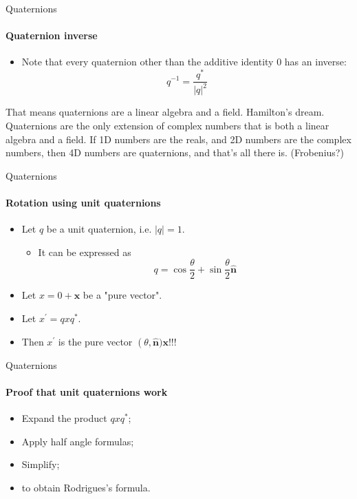 \documentclass[aspectratio=169]{beamer}
\begin{document}
\begin{frame}{Quaternions}
	\framesubtitle{Quaternion inverse}
    \begin{itemize}
        \item[]Note that every quaternion other than the additive identity $0$ has an inverse:
        \[ q^{-1} = \frac{q^*}{|q|^2} \]
    \end{itemize}
        That means quaternions are a linear algebra and a field.  Hamilton's dream.  Quaternions are the only extension of  complex numbers that is both a linear algebra and a field.  If 1D numbers are the reals, and 2D numbers are the complex numbers, then 4D numbers are quaternions, and that's all there is.  (Frobenius?)
    \end{frame}

\begin{frame}{Quaternions}
    \framesubtitle{Rotation using unit quaternions}

    \begin{itemize}
        \item Let $q$ be a unit quaternion, i.e. $|q|=1$.
        \begin{itemize}
        \item  It can be expressed as
        \begin{equation}
            q = \cos \frac{\theta}{2} + \sin \frac{\theta}{2} \hat{\mathbf{n}} 
        \end{equation}
        \end{itemize}
        \item Let $x = 0 + \mathbf{x}$ be a "pure vector".
        \item Let $x^\prime = qxq^*$.
        \item Then $x^\prime$ is the pure vector $\operatorname(\theta,\hat{\mathbf{n}}) \mathbf{x}$!!!
    \end{itemize}

\end{frame}


\begin{frame}{Quaternions}
    \framesubtitle{Proof that unit quaternions work}
    \begin{itemize}
        \item[] Expand the product $qxq^*$;
        \item[] Apply half angle formulas;
        \item[] Simplify;
        \item[] to obtain Rodrigues's formula.
    \end{itemize}
\end{frame}
\end{document}
